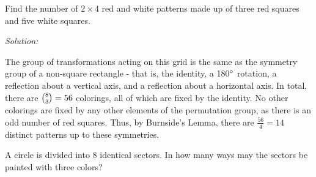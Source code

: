 \documentclass[12pt]{scrartcl}
\newenvironment{problem}[2][Problem]{\begin{trivlist}
\item[\hskip \labelsep {\bfseries #1}\hskip \labelsep {\bfseries #2.}]}{\end{trivlist}}
\newenvironment{solution}
    {\emph{Solution:}
    }
    {
    \qedhere
    }
\begin{document}
\begin{problem}{4} 
Find the number of $2 \times 4$ red and white patterns made up of three red squares and five white squares.  

\end{problem}

\begin{solution}
The group of transformations acting on this grid is the same as the symmetry group of a non-square rectangle - that is, the identity, a 180$^\circ$ rotation, a reflection about a vertical axis, and a reflection about a horizontal axis. In total, there are $\tbinom{8}{3} = 56$ colorings, all of which are fixed by the identity. No other colorings are fixed by any other elements of the permutation group, as there is an odd number of red squares. Thus, by Burnside's Lemma, there are $\frac{56}{4} = \boxed{14}$ distinct patterns up to these symmetries. 

\end{solution}

\begin{problem}{5} 
A circle is divided into 8 identical sectors. In how many ways may the sectors be painted with three colors? 

\end{problem}
\end{document}
